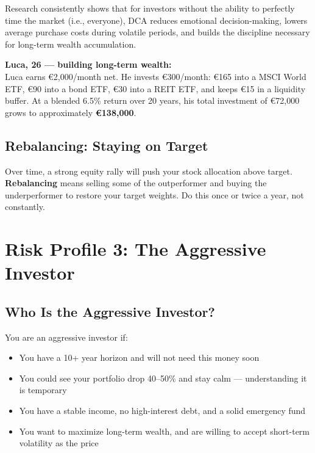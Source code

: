 \documentclass[12pt, a4paper]{book}
\begin{document}
Research consistently shows that for investors without the ability to perfectly time the market (i.e., everyone), DCA reduces emotional decision-making, lowers average purchase costs during volatile periods, and builds the discipline necessary for long-term wealth accumulation.

\begin{examplebox}
\textbf{Luca, 26 --- building long-term wealth:}\\
Luca earns \euro{}2{,}000/month net. He invests \euro{}300/month: \euro{}165 into a MSCI World ETF, \euro{}90 into a bond ETF, \euro{}30 into a REIT ETF, and keeps \euro{}15 in a liquidity buffer. At a blended 6.5\% return over 20 years, his total investment of \euro{}72{,}000 grows to approximately \textbf{\euro{}138{,}000}.
\end{examplebox}

\section{Rebalancing: Staying on Target}

Over time, a strong equity rally will push your stock allocation above target. \textbf{Rebalancing} means selling some of the outperformer and buying the underperformer to restore your target weights. Do this once or twice a year, not constantly.

\chapter{Risk Profile 3: The Aggressive Investor}

\section{Who Is the Aggressive Investor?}

You are an aggressive investor if:
\begin{itemize}[leftmargin=1.5cm]
  \item You have a 10+ year horizon and will not need this money soon
  \item You could see your portfolio drop 40--50\% and stay calm --- understanding it is temporary
  \item You have a stable income, no high-interest debt, and a solid emergency fund
  \item You want to maximize long-term wealth, and are willing to accept short-term volatility as the price
\end{itemize}
\end{document}
